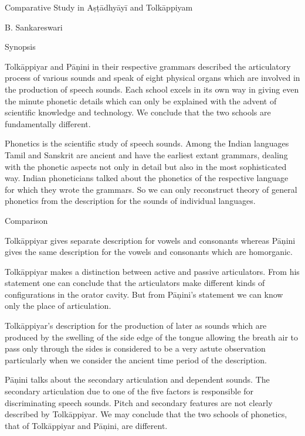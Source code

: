 
Comparative Study in Aṣṭādhyāyī and Tolkāppiyam\label{chap01}

B. Sankareswari

Synopsis

Tolkāppiyar and Pāņini in their respective grammars described the articulatory process of various sounds and speak of eight physical organs which are involved in the production of speech sounds. Each school excels in its own way in giving even the minute phonetic details which can only be explained with the advent of scientific knowledge and technology. We conclude that the two schools are fundamentally different.

Phonetics is the scientific study of speech sounds. Among the Indian languages Tamil and Sanskrit are ancient and have the earliest extant grammars, dealing with the phonetic aspects not only in detail but also in the most sophisticated way. Indian phoneticians talked about the phonetics of the respective language for which they wrote the grammars. So we can only reconstruct theory of general phonetics from the description for the sounds of individual languages.


Comparison

\item Tolkāppiyar gives separate description for vowels and consonants whereas Pāņini gives the same description for the vowels and consonants which are homorganic.

 \item Tolkāppiyar makes a distinction between active and passive articulators. From his statement one can conclude that the articulators make different kinds of configurations in the orator cavity. But from Pāņini’s statement we can know only the place of articulation.

 \item Tolkāppiyar’s description for the production of later as sounds which are produced by the swelling of the side edge of the tongue allowing the breath air to pass only through the sides is considered to be a very astute observation particularly when we consider the ancient time period of the description.

 \item Pāņini talks about the secondary articulation and dependent sounds. The secondary articulation due to one of the five factors is responsible for discriminating speech sounds. Pitch and secondary features are not clearly described by Tolkāppiyar. We may conclude that the two schools of phonetics, that of Tolkāppiyar and Pāņini, are different. 

